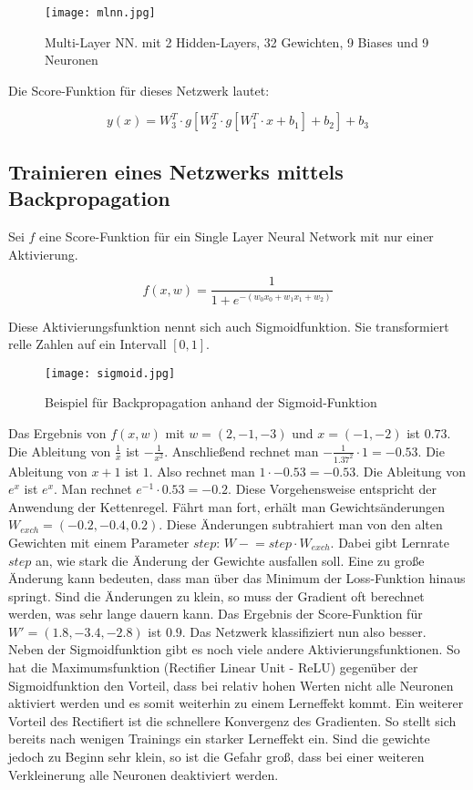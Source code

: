 \documentclass[11pt,ceqn]{book}
\newcommand{\minuseq}{\mathrel{-}=}
\begin{document}
\begin{figure}[H]
\centering
\texttt{[image: mlnn.jpg]}
\caption{Multi-Layer NN. mit 2 Hidden-Layers, 32 Gewichten, 9 Biases und 9 Neuronen}
\end{figure}

Die Score-Funktion für dieses Netzwerk lautet:

\[y(x) = W_3^T \cdot g[W_2^T \cdot g[W_1^T \cdot x+b_1]+b_2]+b_3\]


\subsection{Trainieren eines Netzwerks mittels Backpropagation}
Sei $f$ eine Score-Funktion für ein Single Layer Neural Network mit nur einer Aktivierung.

\[f(x,w) = \frac{1}{1+e^{-(w_0x_0+w_1x_1+w_2)}}\]

Diese Aktivierungsfunktion nennt sich auch Sigmoidfunktion. Sie transformiert relle Zahlen auf ein Intervall $\left[0, 1\right]$.

\begin{figure}[H]
\centering
\texttt{[image: sigmoid.jpg]}
\caption{Beispiel für Backpropagation anhand der Sigmoid-Funktion}
\end{figure}

Das Ergebnis von $f(x,w)$ mit $w = (2,-1,-3)$ und $x = (-1,-2)$ ist $0.73$. Die Ableitung von  $\frac{1}{x}$ ist $-\frac{1}{x^2}$. Anschließend rechnet man $-\frac{1}{1.37^2}\cdot 1 = -0.53$. Die Ableitung von $x+1$ ist $1$. Also rechnet man $1\cdot -0.53=-0.53$. Die Ableitung von $e^x$ ist $e^x$. Man rechnet $e^{-1}\cdot 0.53=-0.2$. Diese Vorgehensweise entspricht der Anwendung der Kettenregel. Fährt man fort, erhält man Gewichtsänderungen $W_{exch}=(-0.2,-0.4,0.2)$. Diese Änderungen subtrahiert man von den alten Gewichten mit einem Parameter $step$: $W \minuseq step \cdot W_{exch}$. Dabei gibt Lernrate $step$ an, wie stark die Änderung der Gewichte ausfallen soll. Eine zu große Änderung kann bedeuten, dass man über das Minimum der Loss-Funktion hinaus springt. Sind die Änderungen zu klein, so muss der Gradient oft berechnet werden, was sehr lange dauern kann. Das Ergebnis der Score-Funktion für $W' = (1.8,-3.4,-2.8)$ ist $0.9$. Das Netzwerk klassifiziert nun also besser.\\
\bigskip
Neben der Sigmoidfunktion gibt es noch viele andere Aktivierungsfunktionen. So hat die Maximumsfunktion (Rectifier Linear Unit - ReLU) gegenüber der Sigmoidfunktion den Vorteil, dass bei relativ hohen Werten nicht alle Neuronen aktiviert werden und es somit weiterhin zu einem Lerneffekt kommt. Ein weiterer Vorteil des Rectifiert ist die schnellere Konvergenz des Gradienten. So stellt sich bereits nach wenigen Trainings ein starker Lerneffekt ein. Sind die gewichte jedoch zu Beginn sehr klein, so ist die Gefahr groß, dass bei einer weiteren Verkleinerung alle Neuronen deaktiviert werden.
\end{document}
